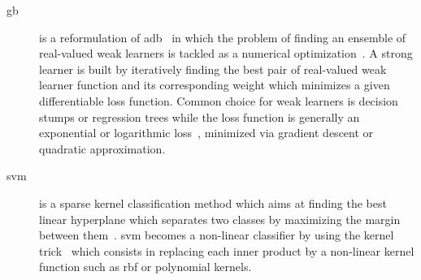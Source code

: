 \begin{description}
\item[\acf{gb}] is a reformulation of \ac{adb}~\cite{friedman2002stochastic} in which the problem of finding an ensemble of real-valued weak learners is tackled as a numerical optimization~\cite{lemaitre2015boosting}.
A strong learner is built by iteratively finding the best pair of real-valued weak learner function and its corresponding weight which minimizes a given differentiable loss function.
Common choice for weak learners is decision stumps or regression trees while the loss function is generally an exponential or logarithmic loss~\cite{becker2013supervised}, minimized via gradient descent or quadratic approximation.

\item[\acf{svm}] is a sparse kernel classification method which aims at finding the best linear hyperplane which separates two classes by maximizing the margin between them~\cite{vapnik1963generalized}.
\ac{svm} becomes a non-linear classifier by using the kernel trick~\cite{aizerman1964} which consists in replacing each inner product by a non-linear kernel function such as \ac{rbf} or polynomial kernels.


\end{description}




